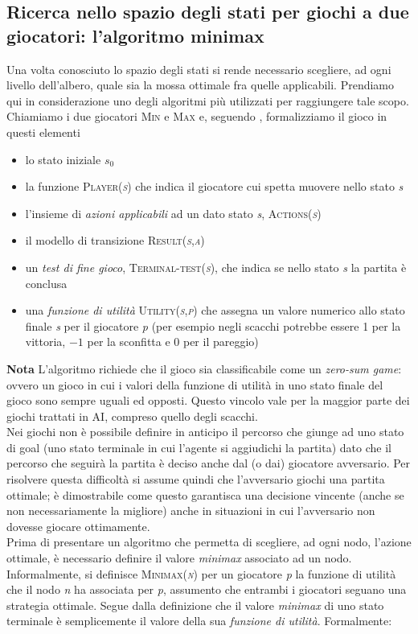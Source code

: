 \subsection{Ricerca nello spazio degli stati per giochi a due giocatori: l'algoritmo minimax}
Una volta conosciuto lo spazio degli stati si rende necessario scegliere, ad ogni livello dell'albero, quale sia la mossa ottimale fra quelle applicabili.
Prendiamo qui in considerazione uno degli algoritmi più utilizzati per raggiungere tale scopo.\\
Chiamiamo i due giocatori \textsc{Min} e \textsc{Max} e, seguendo \cite{randw}, formalizziamo il gioco in questi elementi
\begin{itemize}
   \item lo stato iniziale \emph{$s_0$} 
   \item la funzione \textsc{Player(\emph{s})} che indica il giocatore cui spetta muovere nello stato \emph{s}
   \item l'insieme di \emph{azioni applicabili} ad un dato stato \emph{s}, \textsc{Actions(\emph{s})}
   \item il modello di transizione \textsc{Result(\emph{s},\emph{a})}
   \item un \emph{test di fine gioco}, \textsc{Terminal-test(\emph{s})}, che indica se nello stato  \emph{s} la partita è conclusa
   \item una \emph{funzione di utilità} \textsc{Utility(\emph{s},\emph{p})} che assegna un valore numerico allo stato finale \emph{s} per il giocatore \emph{p} (per esempio negli scacchi potrebbe essere 1 per la vittoria, $-1$ per la sconfitta e 0 per il pareggio)
\end{itemize}

\textbf{Nota} L'algoritmo richiede che il gioco sia classificabile come un \emph{zero-sum game}: ovvero un gioco in cui i valori della funzione di utilità in uno stato finale del gioco sono sempre uguali ed opposti.
Questo vincolo vale per la maggior parte dei giochi trattati in AI, compreso quello degli scacchi.\\

Nei giochi non è possibile definire in anticipo il percorso che giunge ad uno stato di goal (uno stato terminale in cui l'agente si aggiudichi la partita) dato che il percorso che seguirà la partita è deciso anche dal (o dai) giocatore avversario.
Per risolvere questa difficoltà si assume quindi che l'avversario giochi una partita ottimale; è dimostrabile come questo garantisca una decisione vincente (anche se non necessariamente la migliore) anche in situazioni in cui l'avversario non dovesse giocare ottimamente.\\
Prima di presentare un algoritmo che permetta di scegliere, ad ogni nodo, l'azione ottimale, è necessario definire il valore \emph{minimax} associato ad un nodo.
Informalmente, si definisce \textsc{Minimax(\emph{n})} per un giocatore \emph{p }la funzione di utilità che il nodo \emph{n} ha associata per \emph{p}, assumento che entrambi i giocatori seguano una strategia ottimale.
Segue dalla definizione che il valore \emph{minimax} di uno stato terminale è semplicemente il valore della sua \emph{funzione di utilità}.
Formalmente:

